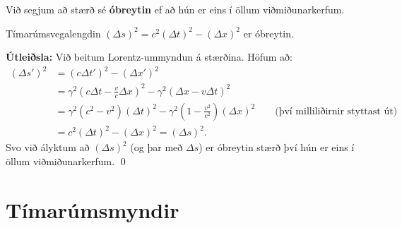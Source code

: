 \begin{tcolorbox}
\begin{definition}
Við segjum að stærð sé \textbf{óbreytin} ef að hún er eins í öllum viðmiðunarkerfum.
\end{definition}
\end{tcolorbox}


\begin{tcolorbox}
\begin{theorem}
Tímarúmsvegalengdin $(\Delta s)^2 = c^2 (\Delta t)^2 - (\Delta x)^2$ er óbreytin.
\end{theorem}
\end{tcolorbox}

\textbf{Útleiðsla:} Við beitum Lorentz-ummyndun á stærðina. Höfum að:
\begin{align*}
    (\Delta s')^2 &= (c\Delta t')^2 - (\Delta x')^2 \\ &= \gamma^2 \left( c \Delta t - \frac{v}{c} \Delta x \right)^2 - \gamma^2 \left( \Delta x - v\Delta t \right)^2 \\
    &= \gamma^2(c^2-v^2)(\Delta t)^2 - \gamma^2\left(1 - \frac{v^2}{c^2}\right)(\Delta x)^2 \qquad \text{(því milliliðirnir styttast út)} \\
    &= c^2 (\Delta t)^2 - (\Delta x)^2 = (\Delta s)^2.
\end{align*}
Svo við ályktum að $(\Delta s)^2$ (og þar með $\Delta s$) er óbreytin stærð því hún er eins í öllum viðmiðunarkerfum. \qed

\newpage

\section{Tímarúmsmyndir}

